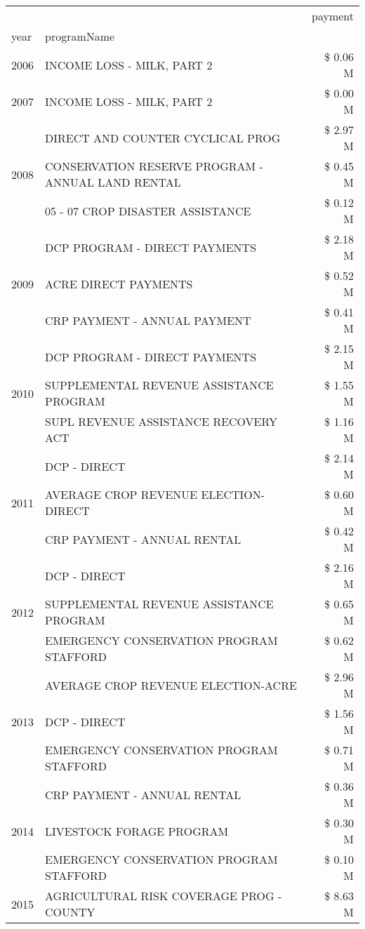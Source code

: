 \begin{tabular}{llr}
\toprule
 &  & payment \\
year & programName &  \\
\midrule
2006 & INCOME LOSS - MILK, PART 2 & \$ 0.06 M \\
\cline{1-3}
2007 & INCOME LOSS - MILK, PART 2 & \$ 0.00 M \\
\cline{1-3}
\multirow[t]{3}{*}{2008} & DIRECT AND COUNTER CYCLICAL PROG & \$ 2.97 M \\
 & CONSERVATION RESERVE PROGRAM - ANNUAL LAND RENTAL & \$ 0.45 M \\
 & 05 - 07 CROP DISASTER ASSISTANCE & \$ 0.12 M \\
\cline{1-3}
\multirow[t]{3}{*}{2009} & DCP PROGRAM - DIRECT PAYMENTS & \$ 2.18 M \\
 & ACRE DIRECT PAYMENTS & \$ 0.52 M \\
 & CRP PAYMENT - ANNUAL PAYMENT & \$ 0.41 M \\
\cline{1-3}
\multirow[t]{3}{*}{2010} & DCP PROGRAM - DIRECT PAYMENTS & \$ 2.15 M \\
 & SUPPLEMENTAL REVENUE ASSISTANCE PROGRAM & \$ 1.55 M \\
 & SUPL REVENUE ASSISTANCE RECOVERY ACT & \$ 1.16 M \\
\cline{1-3}
\multirow[t]{3}{*}{2011} & DCP - DIRECT & \$ 2.14 M \\
 & AVERAGE CROP REVENUE ELECTION-DIRECT & \$ 0.60 M \\
 & CRP PAYMENT - ANNUAL RENTAL & \$ 0.42 M \\
\cline{1-3}
\multirow[t]{3}{*}{2012} & DCP - DIRECT & \$ 2.16 M \\
 & SUPPLEMENTAL REVENUE ASSISTANCE PROGRAM & \$ 0.65 M \\
 & EMERGENCY CONSERVATION PROGRAM STAFFORD & \$ 0.62 M \\
\cline{1-3}
\multirow[t]{3}{*}{2013} & AVERAGE CROP REVENUE ELECTION-ACRE & \$ 2.96 M \\
 & DCP - DIRECT & \$ 1.56 M \\
 & EMERGENCY CONSERVATION PROGRAM STAFFORD & \$ 0.71 M \\
\cline{1-3}
\multirow[t]{3}{*}{2014} & CRP PAYMENT - ANNUAL RENTAL & \$ 0.36 M \\
 & LIVESTOCK FORAGE PROGRAM & \$ 0.30 M \\
 & EMERGENCY CONSERVATION PROGRAM STAFFORD & \$ 0.10 M \\
\cline{1-3}
\multirow[t]{3}{*}{2015} & AGRICULTURAL RISK COVERAGE PROG - COUNTY & \$ 8.63 M \\

\end{tabular}

